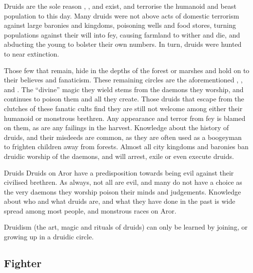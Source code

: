 Druids are the sole reason , ,
and  exist, and terrorise the humanoid and beast
population to this day. Many druids were not above acts of domestic terrorism
against large baronies and kingdoms, poisoning wells and food stores, turning
populations against their will into fey, causing farmland to wither and die,
and abducting the young to bolster their own numbers. In turn, druids were
hunted to near extinction.

Those few that remain, hide in the depths of the forest or marshes and hold on
to their believes and fanaticism. These remaining circles are the
aforementioned , ,
 and . The ``divine'' magic they
wield stems from the daemons they worship, and continues to poison them and
all they create. Those druids that escape from the clutches of these fanatic
cults find they are still not welcome among either their humanoid or monstrous
brethren. Any appearance and terror from fey is blamed on them, as are any
failings in the harvest. Knowledge about the history of druids, and their
misdeeds are common, as they are often used as a boogeyman to frighten
children away from forests. Almost all city kingdoms and baronies ban druidic
worship of the daemons, and will arrest, exile or even execute druids.


\begin{35e}{Druids}
  Druids on Aror have a predisposition towards being evil against their
  civilised brethren. As always, not all are evil, and many do not have a
  choice as the very daemons they worship poison their minds and judgements.
  Knowledge about who and what druids are, and what they have done in the
  past is wide spread among most people, and monstrous races on Aror.

  Druidism (the art, magic and rituals of druids) can only be learned by
  joining, or growing up in a druidic circle.
\end{35e}

\subsection{Fighter}
\label{sec:Fighter}

